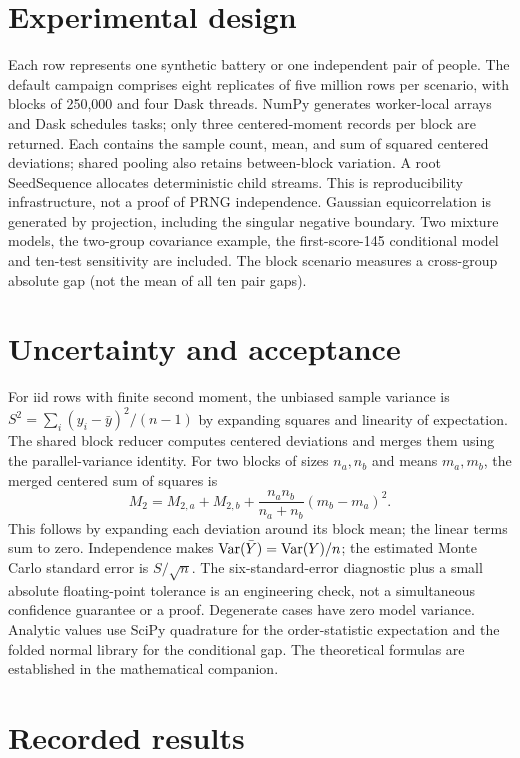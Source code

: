 \chapter{Experimental design}
Each row represents one synthetic battery or one independent pair of people.
The default campaign comprises eight replicates of five million rows per
scenario, with blocks of 250,000 and four Dask threads. NumPy generates
worker-local arrays and Dask schedules tasks; only three centered-moment records per block
are returned. Each contains the sample count, mean, and sum of squared
centered deviations; shared pooling also retains between-block variation. A root SeedSequence allocates deterministic child streams.
This is reproducibility infrastructure, not a proof of PRNG independence.
Gaussian equicorrelation is generated by projection, including the singular
negative boundary. Two mixture models, the two-group covariance example,
the first-score-145 conditional model and ten-test sensitivity are included.
The block scenario measures a cross-group absolute gap (not the mean of all
ten pair gaps).
\chapter{Uncertainty and acceptance}
For iid rows with finite second moment, the unbiased sample variance is
$S^2=\sum_i(y_i-\bar y)^2/(n-1)$ by expanding squares and linearity
of expectation. The shared block reducer computes centered deviations and
merges them using the parallel-variance identity. For two blocks of sizes
$n_a,n_b$ and means $m_a,m_b$, the merged centered sum of squares is
\[M_2=M_{2,a}+M_{2,b}+\frac{n_a n_b}{n_a+n_b}(m_b-m_a)^2.\]
This follows by expanding each deviation around its block mean; the
linear terms sum to zero. Independence makes $\operatorname{Var}(\bar Y)=\operatorname{Var}(Y)/n$;
the estimated Monte Carlo standard error is $S/\sqrt n$.
The six-standard-error diagnostic plus a small absolute floating-point
tolerance is an engineering check, not a simultaneous confidence guarantee
or a proof. Degenerate cases have zero model variance.
Analytic values use SciPy quadrature for the order-statistic expectation
and the folded normal library for the conditional gap. The theoretical
formulas are established in the mathematical companion.
\chapter{Recorded results}
